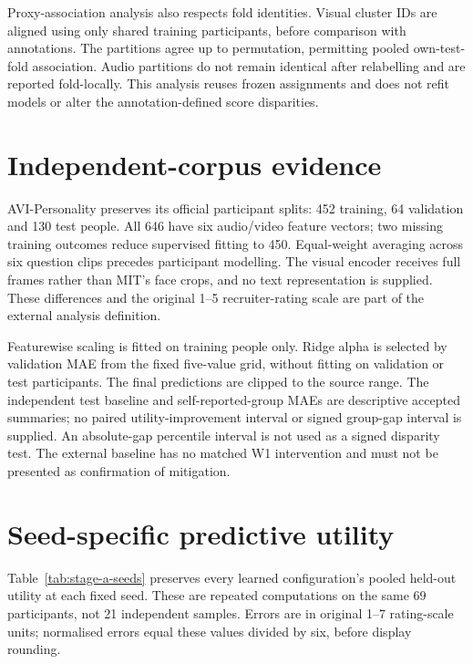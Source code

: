 Proxy-association analysis also respects fold identities. Visual cluster IDs are aligned
using only shared training participants, before comparison with annotations. The
partitions agree up to permutation, permitting pooled own-test-fold association.
Audio partitions do not remain identical after relabelling and are reported fold-locally.
This analysis reuses frozen assignments and does not refit models or alter the
annotation-defined score disparities.

\section{Independent-corpus evidence}

AVI-Personality preserves its official participant splits: 452 training, 64 validation
and 130 test people. All 646 have six audio/video feature vectors; two missing training
outcomes reduce supervised fitting to 450. Equal-weight averaging across six question
clips precedes participant modelling. The visual encoder receives full frames rather
than MIT's face crops, and no text representation is supplied. These differences and
the original 1--5 recruiter-rating scale are part of the external analysis definition.

Featurewise scaling is fitted on training people only. Ridge alpha is selected by
validation MAE from the fixed five-value grid, without fitting on validation or test
participants. The final predictions are clipped to the source range. The independent
test baseline and self-reported-group MAEs are descriptive accepted summaries; no
paired utility-improvement interval or signed group-gap interval is supplied.
An absolute-gap percentile interval is not used as a signed disparity test.
The external baseline has no matched W1 intervention and must not be presented
as confirmation of mitigation.

\section{Seed-specific predictive utility}

Table~\ref{tab:stage-a-seeds} preserves every learned configuration's pooled held-out
utility at each fixed seed. These are repeated computations on the same 69 participants,
not 21 independent samples. Errors are in original 1--7 rating-scale units; normalised
errors equal these values divided by six, before display rounding.

